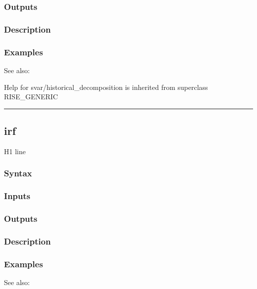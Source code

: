 \documentclass[letterpaper,10pt,english]{sphinxmanual}
\begin{document}
\subsubsection{Outputs}
\label{classes/models/@svar/svar:id29}

\subsubsection{Description}
\label{classes/models/@svar/svar:id30}

\subsubsection{Examples}
\label{classes/models/@svar/svar:id31}
See also:

Help for svar/historical\_decomposition is inherited from superclass RISE\_GENERIC


\bigskip\hrule{}\bigskip



\subsection{irf}
\label{classes/models/@svar/svar:id32}\label{classes/models/@svar/svar:irf}
H1 line


\subsubsection{Syntax}
\label{classes/models/@svar/svar:id33}

\subsubsection{Inputs}
\label{classes/models/@svar/svar:id34}

\subsubsection{Outputs}
\label{classes/models/@svar/svar:id35}

\subsubsection{Description}
\label{classes/models/@svar/svar:id36}

\subsubsection{Examples}
\label{classes/models/@svar/svar:id37}
See also:
\end{document}
